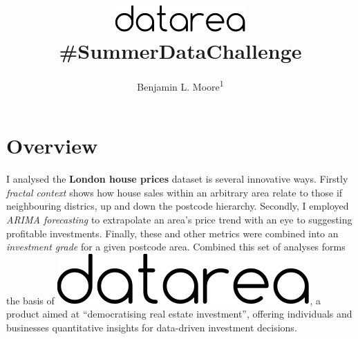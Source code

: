 \documentclass[
10pt, %
a4paper, %
oneside, %
headinclude,footinclude, %
BCOR5mm, %
]{scrartcl}
\title{\includegraphics[width=5cm]{Figures/datarea.pdf} \\
{\large \#SummerDataChallenge}} %
\author{ {\large Benjamin L. Moore\textsuperscript{1}}} %
\date{} %
\newcommand*{\logo}{\includegraphics[scale=.22]{Figures/datarea.pdf}}
\begin{document}

\renewcommand{\sectionmark}[1]{\markright{\spacedlowsmallcaps{summerdatachallenge}}} %
\lehead{\mbox{\llap{\small\thepage\kern1em\color{halfgray} \vline}\color{halfgray}\hspace{0.5em}\rightmark\hfil}} %

\pagestyle{scrheadings} %


\maketitle %

\setcounter{tocdepth}{2} %




\vspace{-4em}
\section*{Overview} 

I analysed the {\bf London house prices} dataset is several innovative
ways. Firstly \emph{fractal context} shows how house sales within an
arbitrary area relate to those if neighbouring districs, up and down
the postcode hierarchy. Secondly, I employed \emph{ARIMA forecasting}
to extrapolate an area's price trend with an eye to suggesting
profitable investments. Finally, these and other metrics were combined
into an \emph{investment grade} for a given postcode area. Combined
this set of analyses forms the basis of \logo, a product aimed at
``democratising real estate investment'', offering individuals and
businesses quantitative insights for data-driven investment
decisions. 
\end{document}
